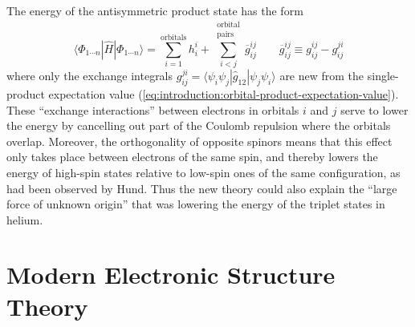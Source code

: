 The energy of the antisymmetric product state has the form
\begin{equation}
    \label{eq:introduction:determinant-expectation-value}
    \langle \Phi_{1\cdots n}|
    \hat{H}
    |\Phi_{1\cdots n} \rangle
    =
    \sum_{i=1}^\mathrm{orbitals}
    h_i^i
    +
    \sum_{i<j}^{\substack{\mathrm{orbital}\\\mathrm{pairs}}}
    \overline{g}_{ij}^{ij}
    \qquad
    \overline{g}_{ij}^{ij}
    \equiv
    g_{ij}^{ij}
    -
    g_{ij}^{ji}
\end{equation}
where only the exchange integrals
\(
    g_{ij}^{ji}
    =
    \langle \psi_i\psi_j|\hat{g}_{12}|\psi_j\psi_i\rangle
\)
are new from the single-product expectation value
(\cref{eq:introduction:orbital-product-expectation-value}).
These ``exchange interactions'' between electrons in orbitals \(i\) and \(j\)
serve to lower the energy by cancelling out part of the Coulomb repulsion where
the orbitals overlap.
Moreover, the orthogonality of opposite spinors means that this effect only
takes place between electrons of the same spin, and thereby lowers the energy of
high-spin states relative to low-spin ones of the same configuration, as had
been observed by Hund.\cite{Hund:1925p345}
Thus the new theory could also explain the ``large force of unknown
origin''\cite{Mehra:1982} that was lowering the energy of the triplet states in
helium.


\section{Modern Electronic Structure Theory}

